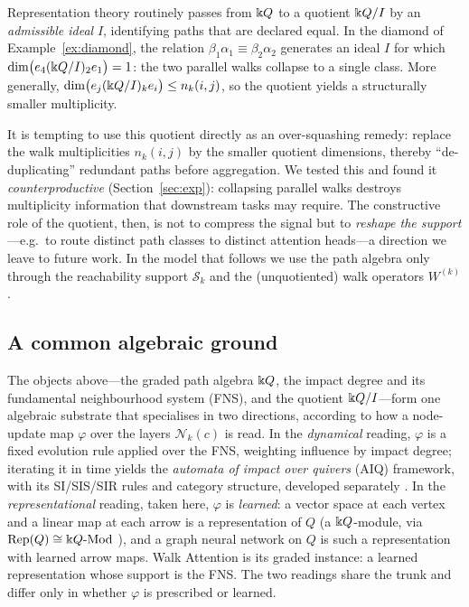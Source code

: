 Representation theory routinely passes from $\Bbbk Q$ to a quotient $\Bbbk Q/I$ by an
\emph{admissible ideal} $I$, identifying paths that are declared equal. In the
diamond of Example~\ref{ex:diamond}, the relation $\beta_1\alpha_1\equiv
\beta_2\alpha_2$ generates an ideal $I$ for which
$\dim\bigl(e_4(\Bbbk Q/I)_2 e_1\bigr)=1$: the two parallel walks collapse to a single
class. More generally, $\dim\bigl(e_j(\Bbbk Q/I)_k e_i\bigr)\le n_k(i,j)$, so the
quotient yields a structurally smaller multiplicity.

It is tempting to use this quotient directly as an over-squashing remedy:
replace the walk multiplicities $n_k(i,j)$ by the smaller quotient dimensions,
thereby ``de-duplicating'' redundant paths before aggregation. We tested this and
found it \emph{counterproductive} (Section~\ref{sec:exp}): collapsing parallel
walks destroys multiplicity information that downstream tasks may require. The
constructive role of the quotient, then, is not to compress the signal but to
\emph{reshape the support}---e.g.\ to route distinct path classes to distinct
attention heads---a direction we leave to future work. In the model that follows
we use the path algebra only through the reachability support $\mathcal{S}_k$ and
the (unquotiented) walk operators $W^{(k)}$.

\subsection{A common algebraic ground}\label{sec:ground}

The objects above---the graded path algebra $\Bbbk Q$, the impact degree and its
fundamental neighbourhood system (FNS), and the quotient $\Bbbk Q/I$---form one
algebraic substrate that specialises in two directions, according to how a
node-update map $\varphi$ over the layers $\mathcal{N}_k(c)$ is read. In the
\emph{dynamical} reading, $\varphi$ is a fixed evolution rule applied over the
FNS, weighting influence by impact degree; iterating it in time yields the
\emph{automata of impact over quivers} (AIQ) framework, with its SI/SIS/SIR rules
and category structure, developed separately
\cite{zainea2026aiq,ibanez2025casimulations}. In the \emph{representational}
reading, taken here, $\varphi$ is \emph{learned}: a vector space at each vertex
and a linear map at each arrow is a representation of $Q$ (a $\Bbbk Q$-module, via
$\mathrm{Rep}(Q)\cong\Bbbk Q\text{-}\mathrm{Mod}$
\cite{schiffler2014quiver,assem2006elements}), and a graph neural network on $Q$
is such a representation with learned arrow maps. Walk Attention is its graded
instance: a learned representation whose support is the FNS. The two readings
share the trunk and differ only in whether $\varphi$ is prescribed or learned.
